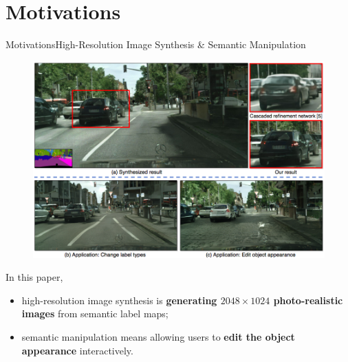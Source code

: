 \documentclass{beamer}
\begin{document}
\section{Motivations}
\begin{frame}{Motivations}{High-Resolution Image Synthesis \& Semantic Manipulation }
\begin{figure}
	\centering
	\includegraphics[height=0.5\textheight]{images/conclusion}
\end{figure}
%
%
\begin{beamerboxesrounded}[upper=uppercol,lower=lowercol,shadow=false]{In this paper,}
	\begin{itemize}
	\item
	high-resolution image synthesis is \textbf{generating $2048\times1024$ photo-realistic images} from semantic label maps;
	\item
	semantic manipulation means allowing users to \textbf{edit the object appearance} interactively.
	\end{itemize}
\end{beamerboxesrounded}
\end{frame}
\end{document}
